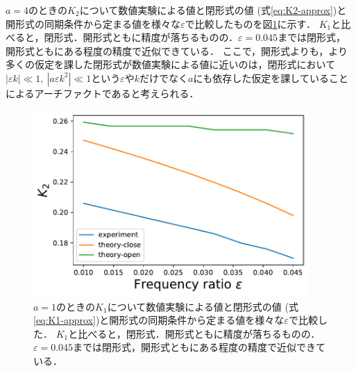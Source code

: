 \documentclass[../main]{subfiles}
\begin{document}
$a=4$のときの$K_2$について数値実験による値と閉形式の値 (式\eqref{eq:K2-approx})と開形式の同期条件から定まる値を様々な$\varepsilon$で比較したものを図\ref{fig:k2-compare}に示す．
$K_1$と比べると，閉形式．開形式ともに精度が落ちるものの．$\varepsilon=0.045$までは閉形式，開形式ともにある程度の精度で近似できている．
ここで，開形式よりも，より多くの仮定を課した閉形式が数値実験による値に近いのは，閉形式において$|\varepsilon k|\ll 1,\ |a\varepsilon k^2| \ll 1$という$\varepsilon$や$k$だけでなく$a$にも依存した仮定を課していることによるアーチファクトであると考えられる．
\begin{figure}[tbp]
\centering
\includegraphics[width=105mm]{./images/k2-compare.pdf}
\centering
\caption{$a=1$のときの$K_1$について数値実験による値と閉形式の値 (式\eqref{eq:K1-approx})と開形式の同期条件から定まる値を様々な$\varepsilon$で比較した．
$K_1$と比べると，閉形式．開形式ともに精度が落ちるものの．$\varepsilon=0.045$までは閉形式，開形式ともにある程度の精度で近似できている．}
\label{fig:k2-compare}
\end{figure}
\end{document}
